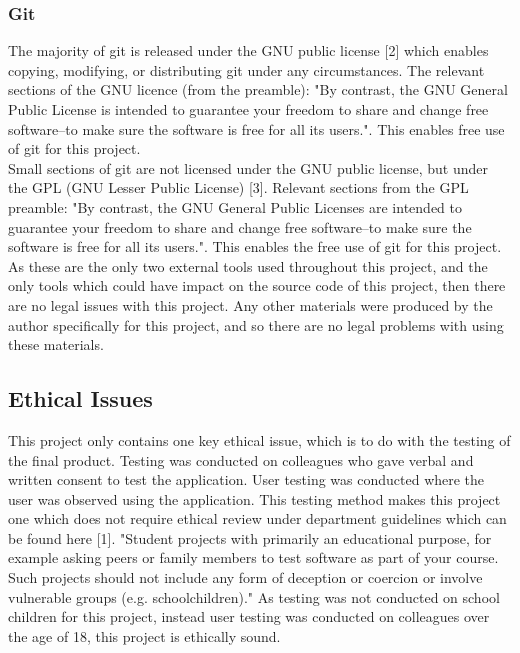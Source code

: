 \documentclass{article}
\begin{document}
\subsubsection{Git}

The majority of git is released under the GNU public license [2] which enables copying, modifying, or distributing git under any circumstances. The relevant sections of the GNU licence (from the preamble): "By contrast, the GNU General Public License is intended to guarantee your freedom to share and change free software--to make sure the software is free for all its users.". This enables free use of git for this project. \\

Small sections of git are not licensed under the GNU public license, but under the GPL (GNU Lesser Public License) [3]. Relevant sections from the GPL preamble: "By contrast, the GNU General Public Licenses are intended to guarantee your freedom to share and change free software--to make sure the software is free for all its users.". This enables the free use of git for this project. \\

As these are the only two external tools used throughout this project, and the only tools which could have impact on the source code of this project, then there are no legal issues with this project. Any other materials were produced by the author specifically for this project, and so there are no legal problems with using these materials. \\

\subsection{Ethical Issues}

This project only contains one key ethical issue, which is to do with the testing of the final product. Testing was conducted on colleagues who gave verbal and written consent to test the application. User testing was conducted where the user was observed using the application. This testing method makes this project one which does not require ethical review under department guidelines which can be found here [1]. "Student projects with primarily an educational purpose, for example asking peers or family members to test software as part of your course. Such projects should not include any form of deception or coercion or involve vulnerable groups (e.g. schoolchildren)." As testing was not conducted on school children for this project, instead user testing was conducted on colleagues over the age of 18, this project is ethically sound. 
\end{document}
